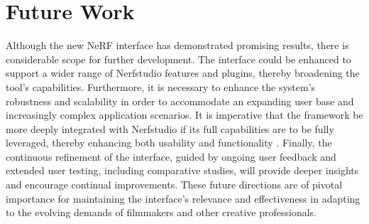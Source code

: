 \section{Future Work}
\label{sec:conclusion:future}

Although the new NeRF interface has demonstrated promising results, there is considerable scope for further development.
The interface could be enhanced to support a wider range of Nerfstudio features and plugins, thereby broadening the tool's capabilities.
Furthermore, it is necessary to enhance the system's robustness and scalability in order to accommodate an expanding user base and increasingly complex application scenarios.
It is imperative that the framework be more deeply integrated with Nerfstudio if its full capabilities are to be fully leveraged, thereby enhancing both usability and functionality .
Finally, the continuous refinement of the interface, guided by ongoing user feedback and extended user testing, including comparative studies, will provide deeper insights and encourage continual improvements.
These future directions are of pivotal importance for maintaining the interface's relevance and effectiveness in adapting to the evolving demands of filmmakers and other creative professionals.